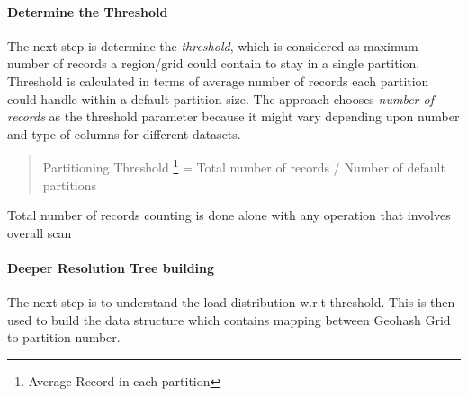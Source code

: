 \documentclass[article,type=msc,colorback,10pt,accentcolor=tud1d]{tudthesis}
\begin{document}
			\paragraph{Determine the Threshold}
				The next step is determine the \textit{threshold}, which is considered as maximum number of records a region/grid could contain to stay in a single partition. Threshold is calculated in terms of average number of records each partition could handle within a default partition size. The approach chooses\textit{ number of records} as the threshold parameter because it might vary depending upon number and type of columns for different datasets.
				
				
				\begin{quote} Partitioning Threshold \footnote{Average Record in each partition}  = Total number  of records / Number of default partitions
				\end{quote}
				
				Total number of records counting is done alone with any operation that involves overall scan
			
			\paragraph{Deeper Resolution Tree building}
				The next step is to understand the load distribution w.r.t threshold. This is then used to build the data structure which contains mapping between Geohash Grid to partition number.
				
\end{document}

